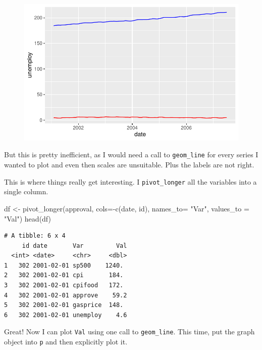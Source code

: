 \documentclass[
  letterpaper,
]{book}
\newenvironment{Shaded}{\begin{snugshade}}{\end{snugshade}}
\newcommand{\AttributeTok}[1]{\textcolor[rgb]{0.40,0.45,0.13}{#1}}
\newcommand{\FunctionTok}[1]{\textcolor[rgb]{0.28,0.35,0.67}{#1}}
\newcommand{\NormalTok}[1]{\textcolor[rgb]{0.00,0.23,0.31}{#1}}
\newcommand{\OtherTok}[1]{\textcolor[rgb]{0.00,0.23,0.31}{#1}}
\newcommand{\SpecialCharTok}[1]{\textcolor[rgb]{0.37,0.37,0.37}{#1}}
\newcommand{\StringTok}[1]{\textcolor[rgb]{0.13,0.47,0.30}{#1}}
\begin{document}
\begin{figure}[H]

{\centering \includegraphics{Appendix1_files/figure-pdf/unnamed-chunk-5-1.pdf}

}

\end{figure}

But this is pretty inefficient, as I would need a call to
\texttt{geom\_line} for every series I wanted to plot and even then
scales are unsuitable. Plus the labels are not right.

This is where things really get interesting. I \texttt{pivot\_longer}
all the variables into a single column.

\begin{Shaded}
\begin{Highlighting}[]
\NormalTok{df }\OtherTok{\textless{}{-}} \FunctionTok{pivot\_longer}\NormalTok{(approval, }\AttributeTok{cols=}\SpecialCharTok{{-}}\FunctionTok{c}\NormalTok{(date, id), }\AttributeTok{names\_to=} \StringTok{"Var"}\NormalTok{, }\AttributeTok{values\_to =} \StringTok{"Val"}\NormalTok{)}
\FunctionTok{head}\NormalTok{(df)}
\end{Highlighting}
\end{Shaded}

\begin{verbatim}
# A tibble: 6 x 4
     id date       Var         Val
  <int> <date>     <chr>     <dbl>
1   302 2001-02-01 sp500    1240. 
2   302 2001-02-01 cpi       184. 
3   302 2001-02-01 cpifood   172. 
4   302 2001-02-01 approve    59.2
5   302 2001-02-01 gasprice  148. 
6   302 2001-02-01 unemploy    4.6
\end{verbatim}

Great! Now I can plot \texttt{Val} using one call to
\texttt{geom\_line}. This time, put the graph object into \texttt{p} and
then explicitly plot it.
\end{document}
